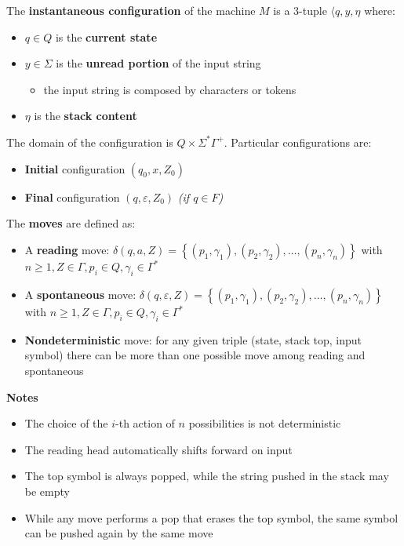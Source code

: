 \documentclass[english]{article}
\begin{document}
\bigskip
The \textbf{instantaneous configuration} of the machine \(M\) is a \(3\)-tuple \(\langle q, y, \eta\) where:

\begin{itemize}
  \item \(q \in Q\) is the \textbf{current state}
  \item \(y \in \Sigma\) is the \textbf{unread portion} of the input string
        \begin{itemize}
          \item the input string is composed by characters or tokens
        \end{itemize}
  \item \(\eta\) is the \textbf{stack content}
\end{itemize}

The domain of the configuration is \(Q \times \Sigma^\ast \Gamma^+\).
Particular configurations are:

\begin{itemize}
  \item \textbf{Initial} configuration \(\left( q_0, x, Z_0 \right)\)
  \item \textbf{Final} configuration \(\left( q, \varepsilon, Z_0 \right)\) \textit{(if \(q \in F\))}
\end{itemize}

\bigskip

The \textbf{moves} are defined as:

\begin{itemize}
  \item A \textbf{reading} move: \(\delta(q, a, Z) = \left\{ (p_1, \gamma_1), (p_2, \gamma_2), \ldots, (p_n, \gamma_n) \right\}\) with \(n \geq 1, Z \in \Gamma, p_i \in Q, \gamma_i \in \Gamma^\ast\)
  \item A \textbf{spontaneous} move: \(\delta(q, \varepsilon, Z) = \left\{ (p_1, \gamma_1), (p_2, \gamma_2), \ldots, (p_n, \gamma_n) \right\}\) with \(n \geq 1, Z \in \Gamma, p_i \in Q, \gamma_i \in \Gamma^\ast\)
  \item \textbf{Nondeterministic} move: for any given triple (state, stack top, input symbol) there can be more than one possible move among reading and spontaneous
\end{itemize}

\textbf{Notes}
\begin{itemize}
  \item The choice of the \(i\)-th action of \(n\) possibilities is not deterministic
  \item The reading head automatically shifts forward on input
  \item The top symbol is always popped, while the string pushed in the stack may be empty
  \item While any move performs a pop that erases the top symbol, the same symbol can be pushed again by the same move
\end{itemize}
\end{document}
